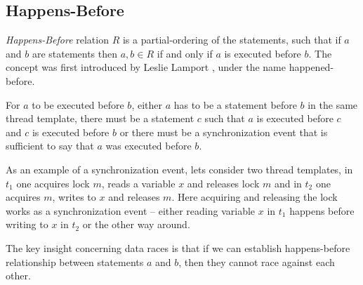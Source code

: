 \documentclass[..thesis.tex]{subfiles}
\begin{document}
\subsection{Happens-Before}

\textit{Happens-Before} relation $R$ is a partial-ordering of the statements, such that if $a$ and $b$ are statements then  $a,b \in R$ if and only if $a$ is executed before $b$. The concept was first introduced by Leslie Lamport \cite{lamport_time_1978}, under the name happened-before.

For $a$ to be executed before $b$, either $a$ has to be a statement before $b$ in the same thread template, there must be a statement $c$ such that $a$ is executed before $c$ and $c$ is executed before $b$ or there must be a synchronization event that is sufficient to say that $a$ was executed before $b$.


As an example of a synchronization event, lets consider two thread templates, in $t_1$ one acquires lock $m$, reads a variable $x$ and releases lock $m$ and in $t_2$ one acquires $m$, writes to $x$ and releases $m$. Here acquiring and releasing the lock works as a synchronization event -- either reading variable $x$ in $t_1$ happens before writing to $x$ in $t_2$ or the other way around.

The key insight concerning data races is that if we can establish happens-before relationship between statements $a$ and $b$, then they cannot race against each other. 
\end{document}
